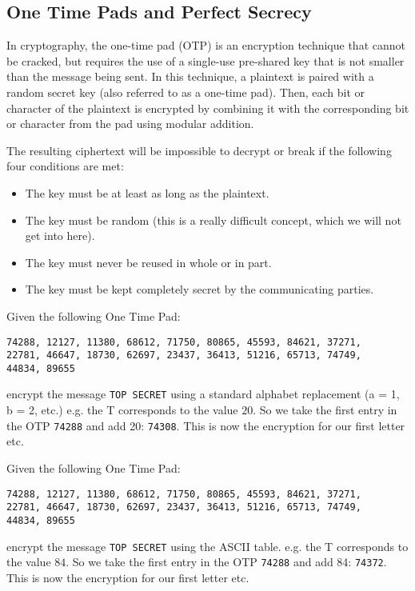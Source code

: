 \documentclass[11pt,a4paper]{report}
\begin{document}
\subsection{One Time Pads and Perfect Secrecy}


In cryptography, the one-time pad (OTP) is an encryption technique that cannot be cracked, but requires the use of a single-use pre-shared key that is not smaller than the message being sent. In this technique, a plaintext is paired with a random secret key (also referred to as a one-time pad). Then, each bit or character of the plaintext is encrypted by combining it with the corresponding bit or character from the pad using modular addition.

The resulting ciphertext will be impossible to decrypt or break if the following four conditions are met:
\begin{itemize}
\item The key must be at least as long as the plaintext.
\item The key must be random (this is a really difficult concept, which we will not get into here).
\item The key must never be reused in whole or in part.
\item The key must be kept completely secret by the communicating parties.
\end{itemize}

\begin{ex}
Given the following One Time Pad: 
\begin{verbatim}
74288, 12127, 11380, 68612, 71750, 80865, 45593, 84621, 37271,
22781, 46647, 18730, 62697, 23437, 36413, 51216, 65713, 74749,
44834, 89655
\end{verbatim}
encrypt the message \verb|TOP SECRET| using a standard alphabet replacement (a = 1, b = 2, etc.) e.g. the T corresponds to the value $20$. So we take the first entry in the OTP \verb|74288| and add 20: \verb|74308|. This is now the encryption for our first letter etc.
\end{ex}


\begin{ex}
Given the following One Time Pad: 
\begin{verbatim}
74288, 12127, 11380, 68612, 71750, 80865, 45593, 84621, 37271,
22781, 46647, 18730, 62697, 23437, 36413, 51216, 65713, 74749,
44834, 89655
\end{verbatim}
encrypt the message \verb|TOP SECRET| using the ASCII table. e.g. the T corresponds to the value $84$. So we take the first entry in the OTP \verb|74288| and add 84: \verb|74372|. This is now the encryption for our first letter etc.
\end{ex}
\end{document}
